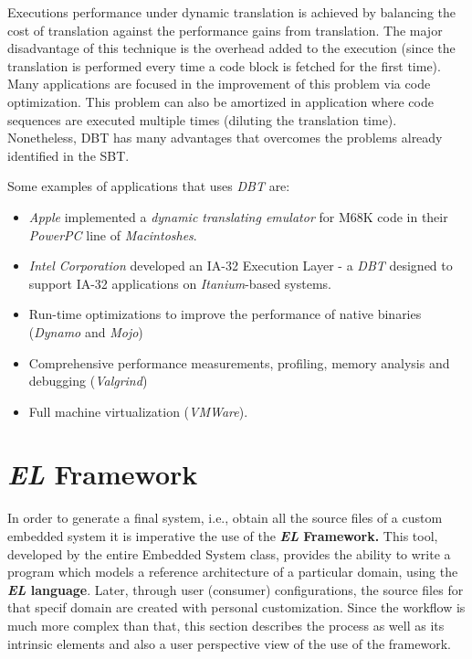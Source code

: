 \documentclass[12pt]{article}
\begin{document}
{Executions performance under dynamic translation is achieved by balancing the cost of translation against the performance gains from translation. \cite{BinaryTranslation2} The major disadvantage of this technique is the overhead added to the execution (since the translation is performed every time a code block is fetched for the first time). Many applications are focused in the improvement of this problem via code optimization. This problem can also be amortized in application where code sequences are executed multiple times (diluting the translation time). Nonetheless, DBT has many advantages that overcomes the problems already identified in the SBT.     

Some examples of applications that uses \textit{DBT} are:
\begin{itemize}
  \item \textit{Apple} implemented a \textit{dynamic translating emulator }for M68K code in their \textit{PowerPC} line of \textit{Macintoshes}.
  \item \textit{Intel Corporation} developed an IA-32 Execution Layer - a \textit{DBT} designed to support IA-32 applications on \textit{Itanium}-based systems.
  \item Run-time optimizations to improve the performance of native binaries (\textit{Dynamo} and \textit{Mojo})
  \item Comprehensive performance measurements, profiling, memory analysis and debugging (\textit{Valgrind})
  \item Full machine virtualization (\textit{VMWare}). \cite{BinaryTranslation2}
\end{itemize}



\newpage
\section{\textit{EL} Framework}

In order to generate a final system, i.e., obtain all the source files of a custom embedded system it is imperative the use of the \textbf{\textit{EL} Framework.} This tool, developed by the entire Embedded System class, provides the ability to write a program which models a reference architecture of a particular domain, using the \textbf{\textit{EL} language}. Later, through user (consumer) configurations, the source files for that specif domain are created with personal customization. Since the workflow is much more complex than that, this section describes the process as well as its intrinsic elements and also a user perspective view of the use of the framework.

}
\end{document}

